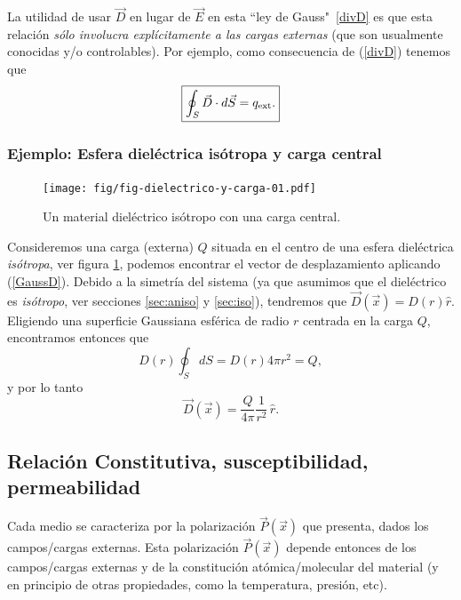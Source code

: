 La utilidad de usar $\vec{D}$ en lugar de $\vec{E}$ en esta ``ley de Gauss"
\,\eqref{divD} es que esta relación \textit{sólo involucra explícitamente a las cargas externas} (que son usualmente conocidas y/o controlables). Por ejemplo, como consecuencia de (\ref{divD}) tenemos que
\begin{equation}
 \boxed{\oint_S \vec{D}\cdot d\vec{S}=q_{\rm ext}.} \label{GaussD}
\end{equation}

\subsubsection{Ejemplo: Esfera dieléctrica isótropa y carga central}
\begin{figure}[!h]
\centerline{\texttt{[image: fig/fig-dielectrico-y-carga-01.pdf]}}
\caption{Un material dieléctrico isótropo con una carga central.}
\label{diel02}
\end{figure}
Consideremos una carga (externa) $Q$ situada en el centro de una
esfera dieléctrica \textit{isótropa}, ver figura \ref{diel02}, podemos encontrar el vector de desplazamiento aplicando (\ref{GaussD}). Debido a la simetría del sistema (ya que asumimos que el dieléctrico es \textit{isótropo}, ver secciones \ref{sec:aniso} y \ref{sec:iso}), tendremos que $\vec{D}(\vec{x})=D(r)\hat{r}$. Eligiendo una superficie Gaussiana esférica de radio $r$ centrada en la carga $Q$, encontramos entonces que
\begin{equation}
 D(r)\oint_S dS=D(r)4\pi r^2=Q,
\end{equation}
y por lo tanto
\begin{equation}
 \vec{D}(\vec{x})=\frac{Q}{4\pi}\frac{1}{r^2}\,\hat{r}.
\end{equation}


\subsection{Relación Constitutiva, susceptibilidad, permeabilidad}

Cada medio se caracteriza por la polarización $\vec{P}(\vec{x})$ que presenta,
dados los campos/cargas externas. Esta polarización $\vec{P}(\vec{x})$ depende
entonces de los campos/cargas externas y de la constitución atómica/molecular
del material (y en principio de otras propiedades, como la temperatura,
presión, etc). 

